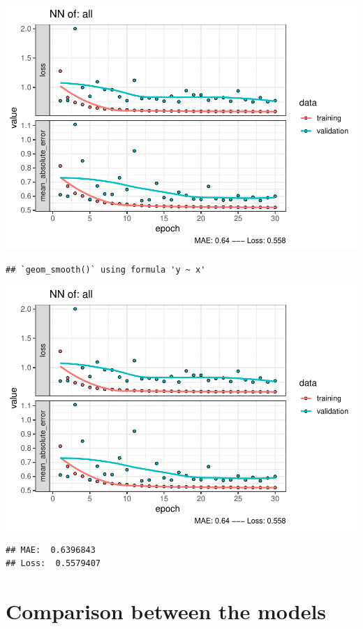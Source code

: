 \documentclass[
]{article}
\begin{document}
\includegraphics{project-code_files/figure-latex/unnamed-chunk-18-41.pdf}

\begin{verbatim}
## `geom_smooth()` using formula 'y ~ x'
\end{verbatim}

\includegraphics{project-code_files/figure-latex/unnamed-chunk-18-42.pdf}

\begin{verbatim}
## MAE:  0.6396843
## Loss:  0.5579407
\end{verbatim}

\hypertarget{comparison-between-the-models}{%
\section{Comparison between the
models}\label{comparison-between-the-models}}
\end{document}

